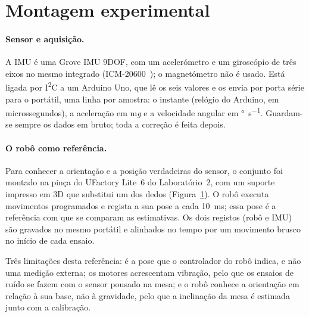 \section{Montagem experimental}
\label{sec:montagem}

\paragraph{Sensor e aquisição.} A IMU é uma Grove IMU 9DOF, com um
acelerómetro e um giroscópio de três eixos no mesmo integrado
(ICM-20600~\cite{icm20600}); o magnetómetro não é usado. Está ligada por
I\textsuperscript{2}C a um Arduino Uno, que lê os seis valores e os envia por
porta série para o portátil, uma linha por amostra: o instante (relógio do
Arduino, em microssegundos), a aceleração em m\emph{g} e a velocidade angular
em \si{\degree\per\second}. Guardam-se sempre os dados em bruto; toda a
correção é feita depois.

\paragraph{O robô como referência.} Para conhecer a orientação e a posição
verdadeiras do sensor, o conjunto foi montado na pinça do UFactory Lite~6 do
Laboratório~2, com um suporte impresso em 3D que substitui um dos dedos
(Figura~\ref{fig:montagem}). O robô executa movimentos programados e regista a
sua pose a cada \SI{10}{\milli\second}; essa pose é a referência com que se
comparam as estimativas. Os dois registos (robô e IMU) são gravados no mesmo
portátil e alinhados no tempo por um movimento brusco no início de cada
ensaio. 

Três limitações desta referência: é a pose que o controlador do robô indica,
e não uma medição externa; os motores acrescentam vibração, pelo que os
ensaios de ruído se fazem com o sensor pousado na mesa; e o robô conhece a
orientação em relação à sua base, não à gravidade, pelo que a inclinação da
mesa é estimada junto com a calibração.

\begin{figure}[H]
\centering
{}
\caption{}
\label{fig:montagem}
\end{figure}

